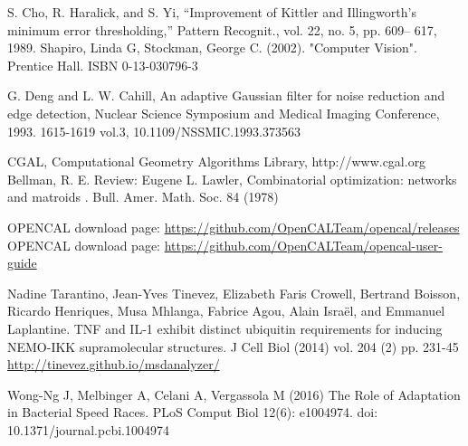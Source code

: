 \documentclass[conference]{IEEEtran}
\begin{document}
%
%
%
\begin{thebibliography}{1}

S. Cho, R. Haralick, and S. Yi, “Improvement of Kittler and Illingworth’s minimum error thresholding,” Pattern Recognit., vol. 22, no. 5, pp. 609– 617, 1989.
Shapiro, Linda G, Stockman, George C. (2002). "Computer Vision". Prentice Hall. ISBN 0-13-030796-3

G. Deng and L. W. Cahill, An adaptive Gaussian filter for noise reduction and edge detection, Nuclear Science Symposium and Medical Imaging Conference, 1993. 1615-1619 vol.3, 10.1109/NSSMIC.1993.373563

CGAL, Computational Geometry Algorithms Library, http://www.cgal.org
Bellman, R. E. Review: Eugene L. Lawler, Combinatorial optimization: networks and matroids . 
 Bull. Amer. Math. Soc. 84 (1978)


OPENCAL download page: \url{https://github.com/OpenCALTeam/opencal/releases}
OPENCAL download page: \url{https://github.com/OpenCALTeam/opencal-user-guide}

Nadine Tarantino, Jean-Yves Tinevez, Elizabeth Faris Crowell, Bertrand Boisson, Ricardo Henriques, Musa Mhlanga, Fabrice Agou, Alain Israël, and Emmanuel Laplantine. TNF and IL-1 exhibit distinct ubiquitin requirements for inducing NEMO-IKK supramolecular structures. J Cell Biol (2014) vol. 204 (2) pp. 231-45
\url{http://tinevez.github.io/msdanalyzer/}

Wong-Ng J, Melbinger A, Celani A, Vergassola M (2016) The Role of Adaptation in Bacterial Speed Races. PLoS Comput Biol 12(6): e1004974. doi: 10.1371/journal.pcbi.1004974

\end{thebibliography}

% 
\end{document}
